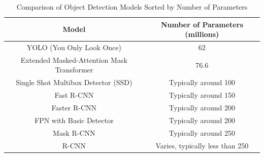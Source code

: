 \begin{table}[h]
    \centering
    \begin{tabular}{|c|c|}
    \hline
    \textbf{Model}                                 & \textbf{Number of Parameters (millions)} \\ \hline
    YOLO (You Only Look Once)                      & 62                                      \\ \hline
    Extended Masked-Attention Mask Transformer     & 76.6                                    \\ \hline
    Single Shot    Multibox Detector (SSD)         & Typically around 100                    \\ \hline
    Fast R-CNN                                     & Typically around 150                    \\ \hline
    Faster R-CNN                                   & Typically around 200                    \\ \hline
    FPN with Basic Detector                        & Typically around 200                    \\ \hline
    Mask R-CNN                                     & Typically around 250                    \\ \hline
    R-CNN                                          & Varies, typically less than 250         \\ \hline
    \end{tabular}
    \caption{Comparison of Object Detection Models Sorted by Number of Parameters}
    \label{tab:model_parameters}
\end{table}
    
